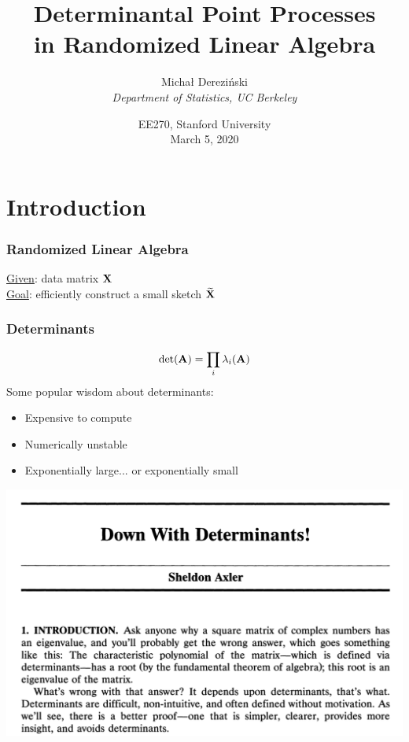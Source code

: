 \documentclass[handout]{beamer}
\title[]{Determinantal Point Processes\\
  in Randomized Linear Algebra}
\author[]{Micha{\l} Derezi\'{n}ski\\
\textit{Department of Statistics, UC Berkeley}}
\date{EE270, Stanford University\\
March 5, 2020}
\begin{document}
\begin{frame}
  \titlepage
\end{frame}

\linespread{1.3}

\section{Introduction}



\begin{frame}
  \frametitle{Randomized Linear Algebra}
\underline{Given}: data matrix $\mathbf X$ \\[2mm]
\underline{Goal}: efficiently construct a small sketch $\widetilde{\mathbf{X}}$ \pause\vspace{1cm}
  \begin{center}
  \hspace{5mm}
\end{center}
\end{frame}

\begin{frame}
  \frametitle{Determinants}
  \[\det(\mathbf A) = \prod_i \lambda_i(\mathbf A)\]\pause
  Some popular wisdom about determinants: \pause
  \vspace{3mm}
  \begin{itemize}
  \item Expensive to compute\pause
    \vspace{3mm}
  \item Numerically unstable\pause
    \vspace{3mm}
    \item Exponentially large... \pause or exponentially small
    \end{itemize}
    \vspace{3mm}
    \pause
\centering    \includegraphics[width=.72\textwidth]{figs/down-with-determinants.png}
  \end{frame}
\end{document}
